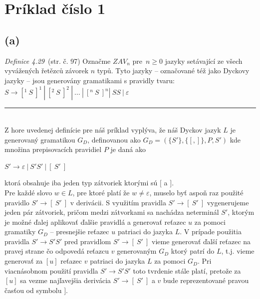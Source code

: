 \documentclass[11pt,a4paper]{article}
\begin{document}
\newpage
\section{Príklad číslo 1} %

\subsection{(a)}\label{sec:a}

\textit{Definice 4.29}~\cite{TIN}(str. č. 97) Označme $ZAV_n$ pre $n \geq 0$ jazyky setávající ze všech vyvážených řetězců závorek $n$ typů. Tyto jazyky -- označované též jako Dyckovy jazyky -- jsou generovány gramatikami s pravidly tvaru: $S \rightarrow [^{1}\ S\ ]^{1} \ |\  [^{2}\ S\ ]^{2} \ |\  ... \ |\  [^{n}\ S\ ]^{n} | \ SS \ | \ \varepsilon $

\rule{17cm}{0.4pt}

\hfill\\[-2em]

Z hore uvedenej definície pre náš príklad vyplýva, že náš Dyckov jazyk $L$ je generovaný gramatikou $G_{D}$, definovanou ako $G_{D} = (\{S'\},\{[,]\},P,S')$ kde množina prepisovacích pravidiel $P$ je daná ako

\begin{center}
$S' \rightarrow \varepsilon \ | \ S'S' \ | \ [\ S' \ ]$
\end{center}

ktorá obsahuje iba jeden typ zátvoriek ktorými sú $[$ a $]$.\\

Pre každé slovo $w \in L$, pre ktoré platí že $w \neq \varepsilon$, muselo byť aspoň raz použité pravidlo $S' \rightarrow [\ S' \ ]$ v derivácii. S využitím pravidla $S' \rightarrow [\ S' \ ]$ vygenerujeme jeden pár zátvoriek, pričom medzi zátvorkami sa nachádza neterminál $S'$, ktorým je možné ďalej aplikovať ďalšie pravidlá a generovať reťazec $u$ za pomoci gramatiky $G_D$ -- presnejšie reťazec $u$ patriaci do jazyka $L$. V prípade použitia pravidla $S' \rightarrow S'S'$ pred pravidlom $S' \rightarrow [\ S' \ ]$ vieme generovať ďalší reťazec na pravej strane čo odpovedá reťazcu $v$ generovaným $G_D$ ktorý patrí do $L$, t.j. vieme generovať za $[u]$ reťazec $v$ patriaci do jazyka $L$ za pomoci $G_D$. Pri viacnásobnom použití pravidla $S' \rightarrow S'S'$ toto tvrdenie stále platí, pretože za $[u]$ sa vezme najľavejšia derivácia $S' \rightarrow [\ S' \ ]$ a $v$ bude reprezentované pravou časťou od symbolu $]$.\\
\end{document}
